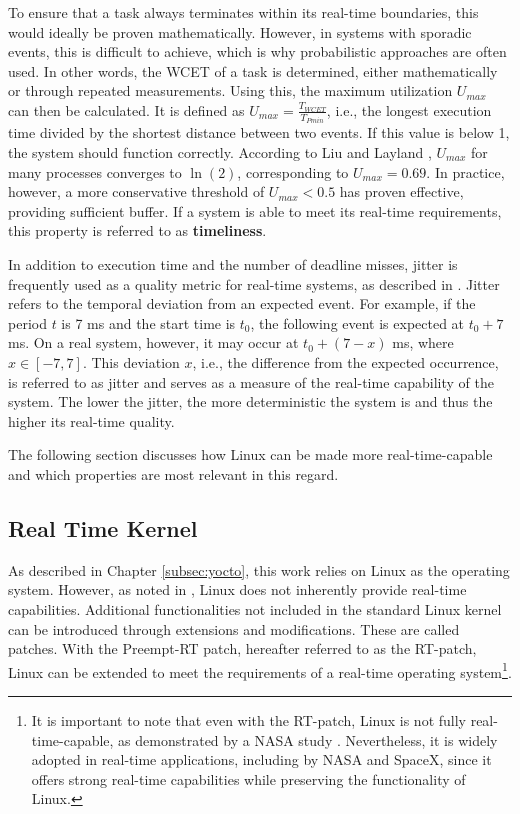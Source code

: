 To ensure that a task always terminates within its real-time boundaries, this would ideally be proven mathematically.  
However, in systems with sporadic events, this is difficult to achieve, which is why probabilistic approaches are often used.  
In other words, the \ac{WCET} of a task is determined, either mathematically or through repeated measurements.  
Using this, the maximum utilization $U_{max}$ can then be calculated.  
It is defined as $U_{max} = \frac{T_{WCET}}{T_{Pmin}}$, i.e., the longest execution time divided by the shortest distance between two events.  
If this value is below 1, the system should function correctly.  
According to Liu and Layland \cite[p. 9]{10.1145/321738.321743}, $U_{max}$ for many processes converges to $\ln(2)$, corresponding to $U_{max} = 0.69$.  
In practice, however, a more conservative threshold of $U_{max} < 0.5$ has proven effective, providing sufficient buffer.  
If a system is able to meet its real-time requirements, this property is referred to as \textbf{timeliness}.  

In addition to execution time and the number of deadline misses, jitter is frequently used as a quality metric for real-time systems, as described in \cite[p. 38]{real_time_systems}.  
Jitter refers to the temporal deviation from an expected event.  
For example, if the period $t$ is 7 ms and the start time is $t_0$, the following event is expected at $t_0 + 7$ ms.  
On a real system, however, it may occur at $t_0 + (7-x)$ ms, where $x \in [-7, 7]$.  
This deviation $x$, i.e., the difference from the expected occurrence, is referred to as jitter and serves as a measure of the real-time capability of the system.  
The lower the jitter, the more deterministic the system is and thus the higher its real-time quality.  

The following section discusses how Linux can be made more real-time-capable and which properties are most relevant in this regard.  

\subsection{Real Time Kernel} \label{subsec:real_time_kernel}
As described in Chapter \ref{subsec:yocto}, this work relies on Linux as the operating system.  
However, as noted in \cite{not_rt}, Linux does not inherently provide real-time capabilities.  
Additional functionalities not included in the standard Linux kernel can be introduced through extensions and modifications.
These are called patches.  
With the Preempt-RT patch, hereafter referred to as the RT-patch, Linux can be extended to meet the requirements of a real-time operating system\footnote{It is important to note that even with the RT-patch, Linux is not fully real-time-capable, as demonstrated by a NASA study \cite{nasa}. Nevertheless, it is widely adopted in real-time applications, including by NASA and SpaceX, since it offers strong real-time capabilities while preserving the functionality of Linux.}.  

